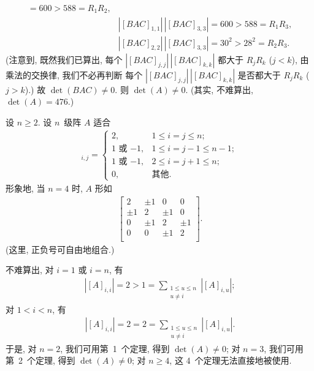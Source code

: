\begin{example}
\begin{align*}
        = 600 > 588 = R_1 R_2,          \\
         & |[BAC]_{1,1}|\,|[BAC]_{3,3}|
        = 600 > 588 = R_1 R_3,          \\
         & |[BAC]_{2,2}|\,|[BAC]_{3,3}|
        = 30^2 > 28^2 = R_2 R_3.
    \end{align*}
    (注意到, 既然我们已算出,
    每个 \(|[BAC]_{j,j}|\,|[BAC]_{k,k}|\)
    都大于 \(R_j R_k\)
    (\(j < k\)),
    由乘法的交换律,
    我们不必再判断%
    每个 \(|[BAC]_{j,j}|\,|[BAC]_{k,k}|\)
    是否都大于 \(R_j R_k\)
    (\(j > k\)).)
    故 \(\det {(BAC)} \neq 0\).
    则 \(\det {(A)} \neq 0\).
    (其实, 不难算出, \(\det {(A)} = 476.\))
\end{example}

\begin{example}\label{emp:NonzeroDet3}
    设 \(n \geq 2\).
    设 \(n\)~级阵 \(A\) 适合
    \begin{align*}
        [A]_{i,j} =
        \begin{cases}
            2,
             & 1 \leq i = j \leq n;         \\
            \text{\(1\) 或 \(-1\)},
             & 1 \leq i = j - 1 \leq n - 1; \\
            \text{\(1\) 或 \(-1\)},
             & 2 \leq i = j + 1 \leq n;     \\
            0,
             & \text{其他}.
        \end{cases}
    \end{align*}
    形象地, 当 \(n = 4\) 时, \(A\) 形如
    \begin{align*}
        \begin{bmatrix}
            2     & \pm 1 & 0     & 0     \\
            \pm 1 & 2     & \pm 1 & 0     \\
            0     & \pm 1 & 2     & \pm 1 \\
            0     & 0     & \pm 1 & 2     \\
        \end{bmatrix}.
    \end{align*}
    (这里, 正负号可自由地组合.)

    不难算出, 对 \(i = 1\) 或 \(i = n\), 有
    \begin{align*}
        |[A]_{i,i}| = 2 > 1
        = \sum_{\substack{1 \leq u \leq n \\ u \neq i}}
        {|[A]_{i,u}|};
    \end{align*}
    对 \(1 < i < n\), 有
    \begin{align*}
        |[A]_{i,i}| = 2 = 2
        = \sum_{\substack{1 \leq u \leq n \\ u \neq i}}
        {|[A]_{i,u}|}.
    \end{align*}
    于是, 对 \(n = 2\), 我们可用第~1~个定理,
    得到 \(\det {(A)} \neq 0\);
    对 \(n = 3\), 我们可用第~2~个定理,
    得到 \(\det {(A)} \neq 0\);
    对 \(n \geq 4\), 这 4~个定理无法直接地被使用.


\end{example}
